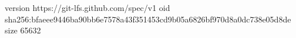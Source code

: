 version https://git-lfs.github.com/spec/v1
oid sha256:bfaeee9446ba90bb6e7578a43f351453cd9b05a6826bf970d8a0dc738e05d8de
size 65632
